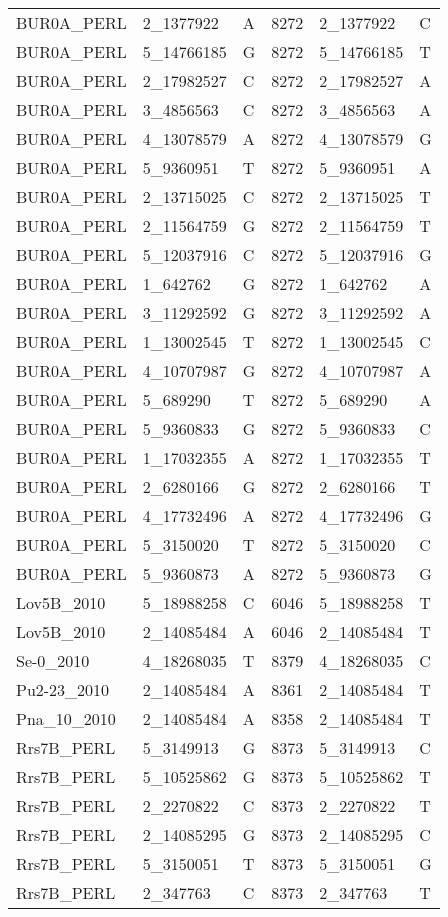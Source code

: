 \begin{center}
\begin{longtable}{|l|l|l|l|l|l|}
BUR0A\_PERL&2\_1377922&A&8272&2\_1377922&C\\
BUR0A\_PERL&5\_14766185&G&8272&5\_14766185&T\\
BUR0A\_PERL&2\_17982527&C&8272&2\_17982527&A\\
BUR0A\_PERL&3\_4856563&C&8272&3\_4856563&A\\
BUR0A\_PERL&4\_13078579&A&8272&4\_13078579&G\\
BUR0A\_PERL&5\_9360951&T&8272&5\_9360951&A\\
BUR0A\_PERL&2\_13715025&C&8272&2\_13715025&T\\
BUR0A\_PERL&2\_11564759&G&8272&2\_11564759&T\\
BUR0A\_PERL&5\_12037916&C&8272&5\_12037916&G\\
BUR0A\_PERL&1\_642762&G&8272&1\_642762&A\\
BUR0A\_PERL&3\_11292592&G&8272&3\_11292592&A\\
BUR0A\_PERL&1\_13002545&T&8272&1\_13002545&C\\
BUR0A\_PERL&4\_10707987&G&8272&4\_10707987&A\\
BUR0A\_PERL&5\_689290&T&8272&5\_689290&A\\
BUR0A\_PERL&5\_9360833&G&8272&5\_9360833&C\\
BUR0A\_PERL&1\_17032355&A&8272&1\_17032355&T\\
BUR0A\_PERL&2\_6280166&G&8272&2\_6280166&T\\
BUR0A\_PERL&4\_17732496&A&8272&4\_17732496&G\\
BUR0A\_PERL&5\_3150020&T&8272&5\_3150020&C\\
BUR0A\_PERL&5\_9360873&A&8272&5\_9360873&G\\
Lov5B\_2010&5\_18988258&C&6046&5\_18988258&T\\
Lov5B\_2010&2\_14085484&A&6046&2\_14085484&T\\
Se-0\_2010&4\_18268035&T&8379&4\_18268035&C\\
Pu2-23\_2010&2\_14085484&A&8361&2\_14085484&T\\
Pna\_10\_2010&2\_14085484&A&8358&2\_14085484&T\\
Rrs7B\_PERL&5\_3149913&G&8373&5\_3149913&C\\
Rrs7B\_PERL&5\_10525862&G&8373&5\_10525862&T\\
Rrs7B\_PERL&2\_2270822&C&8373&2\_2270822&T\\
Rrs7B\_PERL&2\_14085295&G&8373&2\_14085295&C\\
Rrs7B\_PERL&5\_3150051&T&8373&5\_3150051&G\\
Rrs7B\_PERL&2\_347763&C&8373&2\_347763&T\\

\end{longtable}
\end{center}
